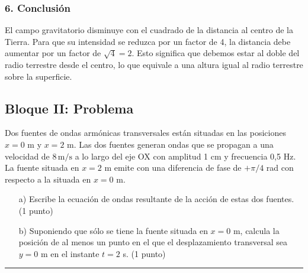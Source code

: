 \subsubsection*{6. Conclusión}
\begin{cajaconclusion}
El campo gravitatorio disminuye con el cuadrado de la distancia al centro de la Tierra. Para que su intensidad se reduzca por un factor de 4, la distancia debe aumentar por un factor de $\sqrt{4}=2$. Esto significa que debemos estar al doble del radio terrestre desde el centro, lo que equivale a una altura igual al radio terrestre sobre la superficie.
\end{cajaconclusion}

\newpage

\subsection{Bloque II: Problema}
\label{subsec:A2_2012_jun_ord}
\begin{cajaenunciado}
Dos fuentes de ondas armónicas transversales están situadas en las posiciones $x=0$ m y $x=2$ m. Las dos fuentes generan ondas que se propagan a una velocidad de $8\,\text{m/s}$ a lo largo del eje OX con amplitud 1 cm y frecuencia 0,5 Hz. La fuente situada en $x=2$ m emite con una diferencia de fase de $+\pi/4$ rad con respecto a la situada en $x=0$ m.
\begin{enumerate}
    \item[a)] Escribe la ecuación de ondas resultante de la acción de estas dos fuentes. (1 punto)
    \item[b)] Suponiendo que sólo se tiene la fuente situada en $x=0$ m, calcula la posición de al menos un punto en el que el desplazamiento transversal sea $y=0$ m en el instante $t=2$ s. (1 punto)
\end{enumerate}
\end{cajaenunciado}
\hrule

